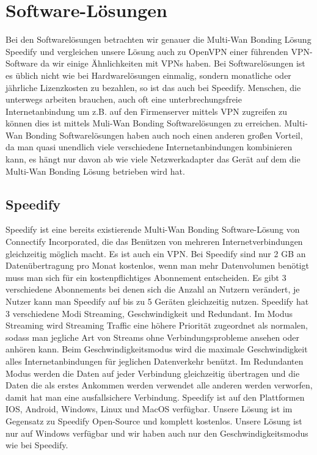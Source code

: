 \section{Software-Lösungen}
Bei den Softwarelösungen betrachten wir genauer die Multi-Wan Bonding Lösung Speedify und vergleichen unsere Lösung auch zu OpenVPN einer führenden VPN-Software da wir einige Ähnlichkeiten mit VPNs haben. Bei Softwarelösungen ist es üblich nicht wie bei Hardwarelösungen einmalig, sondern monatliche oder jährliche Lizenzkosten zu bezahlen, so ist das auch bei Speedify. Menschen, die unterwegs arbeiten brauchen, auch oft eine unterbrechungsfreie Internetanbindung um z.B. auf den Firmenserver mittels VPN zugreifen zu können dies ist mittels Muli-Wan Bonding Softwarelösungen zu erreichen. Multi-Wan Bonding Softwarelösungen haben auch noch einen anderen großen Vorteil, da man quasi unendlich viele verschiedene Internetanbindungen kombinieren kann, es hängt nur davon ab wie viele Netzwerkadapter das Gerät auf dem die Multi-Wan Bonding Lösung betrieben wird hat.


\subsection{Speedify}
Speedify ist eine bereits existierende Multi-Wan Bonding Software-Lösung von Connectify Incorporated, die das Benützen von mehreren Internetverbindungen gleichzeitig möglich macht. Es ist auch ein VPN. Bei Speedify sind nur 2 GB an Datenübertragung pro Monat kostenlos, wenn man mehr Datenvolumen benötigt muss man sich für ein kostenpflichtiges Abonnement entscheiden. Es gibt 3 verschiedene Abonnements bei denen sich die Anzahl an Nutzern verändert, je Nutzer kann man Speedify auf bis zu 5 Geräten gleichzeitig nutzen. Speedify hat 3 verschiedene Modi Streaming, Geschwindigkeit und Redundant. Im Modus Streaming wird Streaming Traffic eine höhere Priorität zugeordnet als normalen, sodass man jegliche Art von Streams ohne Verbindungsprobleme ansehen oder anhören kann. Beim Geschwindigkeitsmodus wird die maximale Geschwindigkeit alles Internetanbindungen für jeglichen Datenverkehr benützt. Im Redundanten Modus werden die Daten auf jeder Verbindung gleichzeitig übertragen und die Daten die als erstes Ankommen werden verwendet alle anderen werden verworfen, damit hat man eine ausfallsichere Verbindung. Speedify ist auf den Plattformen IOS, Android, Windows, Linux und MacOS verfügbar.
\newline
\newline
Unsere Lösung ist im Gegensatz zu Speedify Open-Source und komplett kostenlos. Unsere Lösung ist nur auf Windows verfügbar und wir haben auch nur den Geschwindigkeitsmodus wie bei Speedify.

